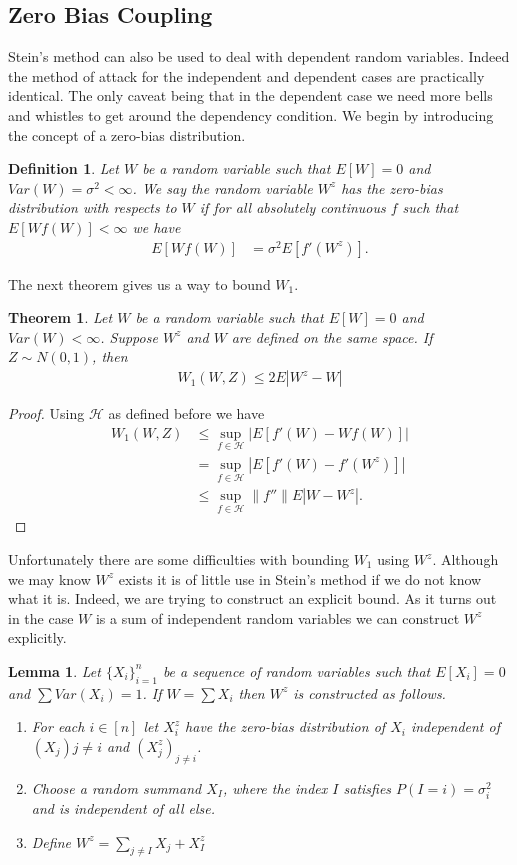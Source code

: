 \documentclass[11pt]{article}
\newtheorem{lemma}{Lemma}
\newtheorem{theorem}{Theorem}
\newtheorem*{defin}{Definition}
\begin{document}
\begin{flushleft}
\section{Zero Bias Coupling}
Stein's method can also be used to deal with dependent random variables.
Indeed the method of attack for the independent and dependent cases
are practically identical. The only caveat being that in
the dependent case we need more bells and whistles to get around the
dependency condition. We begin by introducing the concept of
a zero-bias distribution.

\begin{defin}
  Let $W$ be a random variable such that $E[W] = 0$ and $Var(W) = \sigma^2<\infty$.
  We say the random variable $W^z$ has the zero-bias distribution with
  respects to $W$ if for all absolutely continuous $f$ such that $E[Wf(W)] <\infty$ we have
  \begin{align*}
    E[Wf(W)] &= \sigma^2 E[f'(W^z)].
    \end{align*}
\end{defin}

The next theorem gives us a way to bound $W_1$.

\begin{theorem}
  Let $W$ be a random variable such that $E[W] = 0$ and $Var(W) < \infty$. Suppose
  $W^z$ and $W$ are defined on the same space. If $Z \sim N(0,1)$, then
  \begin{align*}
    W_1(W,Z) \leq 2E|W^z - W|
  \end{align*}
\end{theorem}
\begin{proof}
  Using $\mathcal{H}$ as defined before we have
  \begin{align*}
    W_1(W,Z) &\leq \sup_{f \in \mathcal{H}} |E[f'(W) - Wf(W)]|\\
    &= \sup_{f \in \mathcal{H}} |E[f'(W) - f'(W^z)]|\\
    &\leq \sup_{f \in \mathcal{H}} \|f''\| E|W - W^z|.
    \end{align*}
\end{proof}

Unfortunately there are some difficulties with bounding $W_1$
using $W^z$. Although we may know $W^z$ exists it is
of little use in Stein's method if we do not know what it is. Indeed,
we are trying to construct an explicit bound.
As it turns out in the case $W$ is a sum of independent random
variables we can construct $W^z$ explicitly.

\begin{lemma}
Let $\{X_i\}_{i=1}^n$ be a sequence of random variables such that $E[X_i] = 0$ and $\sum Var(X_i) = 1$.
If $W = \sum X_i$ then $W^z$ is constructed as follows.
\begin{enumerate}
\item
  For each $i \in [n]$ let $X_i^z$ have the zero-bias distribution of $X_i$ independent
of $(X_j){j \neq i}$ and $(X_j^z)_{j \neq i}$.
\item
Choose a random summand $X_I$, where the index $I$ satisfies $P(I = i) = \sigma_i^2$
and is independent of all else.
\item
Define $W^z = \sum_{j \neq I} X_j + X_{I}^{z}$
  

\end{enumerate}
\end{lemma}
\end{flushleft}
\end{document}
